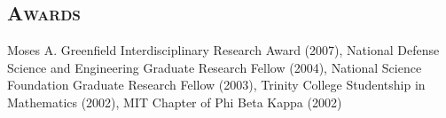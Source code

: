 \begin{resume}
\section{\textsc{Awards}}
Moses A. Greenfield Interdisciplinary Research Award (2007), National Defense Science and Engineering Graduate Research Fellow (2004), National Science Foundation Graduate Research Fellow (2003), Trinity College Studentship in Mathematics (2002), MIT Chapter of Phi Beta Kappa (2002)






\end{resume}

